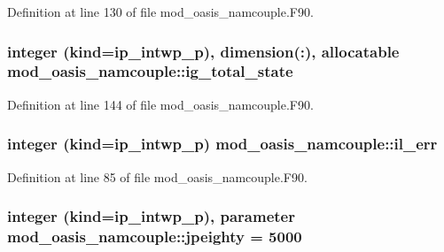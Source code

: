 Definition at line 130 of file mod\+\_\+oasis\+\_\+namcouple.\+F90.

\hypertarget{classmod__oasis__namcouple_a7c783457d0e759e3af98b92146fa4ec3}{
\subsubsection[{ig\+\_\+total\+\_\+state}]{\setlength{\rightskip}{0pt plus 5cm}integer (kind=ip\+\_\+intwp\+\_\+p), dimension(\+:), allocatable mod\+\_\+oasis\+\_\+namcouple\+::ig\+\_\+total\+\_\+state\hspace{0.3cm}{\ttfamily [private]}}}\label{classmod__oasis__namcouple_a7c783457d0e759e3af98b92146fa4ec3}


Definition at line 144 of file mod\+\_\+oasis\+\_\+namcouple.\+F90.

\hypertarget{classmod__oasis__namcouple_a18b7a14f095f3cb6ace40afc06e2a5b9}{
\subsubsection[{il\+\_\+err}]{\setlength{\rightskip}{0pt plus 5cm}integer (kind=ip\+\_\+intwp\+\_\+p) mod\+\_\+oasis\+\_\+namcouple\+::il\+\_\+err\hspace{0.3cm}{\ttfamily [private]}}}\label{classmod__oasis__namcouple_a18b7a14f095f3cb6ace40afc06e2a5b9}


Definition at line 85 of file mod\+\_\+oasis\+\_\+namcouple.\+F90.

\hypertarget{classmod__oasis__namcouple_a4fb10ad6e864dcbe34c4a8b02204a523}{
\subsubsection[{jpeighty}]{\setlength{\rightskip}{0pt plus 5cm}integer (kind=ip\+\_\+intwp\+\_\+p), parameter mod\+\_\+oasis\+\_\+namcouple\+::jpeighty = 5000\hspace{0.3cm}{\ttfamily [private]}}}\label{classmod__oasis__namcouple_a4fb10ad6e864dcbe34c4a8b02204a523}


